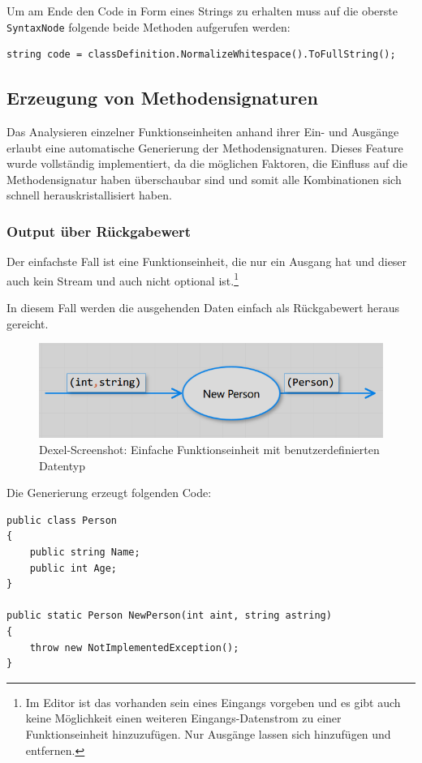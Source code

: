 	Um am Ende den Code in Form eines Strings zu erhalten muss auf die oberste
	\texttt{SyntaxNode} folgende beide Methoden aufgerufen werden:
	
	\begin{lstlisting}[caption=Erhalten des Codes als string]
	string code = classDefinition.NormalizeWhitespace().ToFullString();
	\end{lstlisting}


\subsection{Erzeugung von Methodensignaturen}

Das Analysieren einzelner Funktionseinheiten anhand ihrer Ein- und Ausgänge erlaubt eine automatische Generierung der Methodensignaturen.
Dieses Feature wurde vollständig implementiert, da die möglichen Faktoren, die Einfluss auf die Methodensignatur haben überschaubar sind und somit alle Kombinationen sich schnell herauskristallisiert haben.

\subsubsection{Output über Rückgabewert}

	Der einfachste Fall ist eine Funktionseinheit, die nur ein Ausgang hat und
	dieser auch kein Stream und auch nicht optional ist.\footnote{Im Editor ist das vorhanden sein eines Eingangs vorgeben und es gibt auch keine Möglichkeit einen weiteren Eingangs-Datenstrom zu einer Funktionseinheit hinzuzufügen. Nur Ausgänge lassen sich hinzufügen und entfernen.}
	
	In diesem Fall werden die ausgehenden Daten einfach als Rückgabewert heraus gereicht.
	
	
	\begin{figure}[H]
		\centering
			\includegraphics[width=\linewidth]{./img/roslyn_simpleOutput.png} 
		\caption{Dexel-Screenshot: Einfache Funktionseinheit mit benutzerdefinierten Datentyp}
	\end{figure}

	
	Die Generierung erzeugt folgenden Code:
	\begin{lstlisting}[caption=Mit Dexel generierter Code ]
public class Person
{
	public string Name;
	public int Age;
}

public static Person NewPerson(int aint, string astring)
{
	throw new NotImplementedException();
}
	\end{lstlisting}
	

